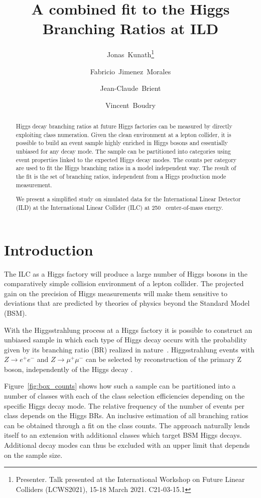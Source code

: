 \documentclass[11pt, hidelinks, a4paper]{scrartcl}
\title{\textbf{A combined fit to the Higgs Branching Ratios at ILD} }
\author{Jonas~Kunath\thanks{Presenter.
    Talk presented at the International Workshop on Future Linear Colliders (LCWS2021),
    15-18 March 2021. C21-03-15.1}
}
\author{Fabricio~Jimenez~Morales}
\author{Jean-Claude~Brient}
\author{Vincent~Boudry}
\affil{Laboratoire Leprince-Ringuet CNRS, \'Ecole Polytechnique,\hspace{2em} Institut Polytechnique de Paris, France}
\date{}
\newcommand{\eV}{\text{e\kern-0.15ex V}\xspace}
\newcommand{\GeV}{\text{G\eV}\xspace}
\begin{document}
\maketitle
\begin{abstract}
Higgs decay branching ratios at future Higgs factories
can be measured by directly exploiting class numeration.
Given the clean environment at a lepton collider,
it is possible to build an event sample highly enriched in Higgs bosons
and essentially unbiased for any decay mode.
The sample can be partitioned into categories using event properties
linked to the expected Higgs decay modes.
The counts per category are used to fit
the Higgs branching ratios in a model independent way.
The result of the fit is the set of branching ratios,
independent from a Higgs production mode measurement.

We present a simplified study on simulated data
for the International Linear Detector (ILD)
at the International Linear Collider (ILC) at 250~\GeV center-of-mass energy.
\end{abstract}

\section{Introduction}
The ILC as a Higgs factory will produce a large number of Higgs bosons
in the comparatively simple collision environment of a lepton collider.
The projected gain on the precision of Higgs measurements
will make them sensitive to deviations
that are predicted by theories of physics beyond the Standard Model (BSM).


With the Higgsstrahlung process at a Higgs factory
it is possible to construct an unbiased sample
in which each type of Higgs decay occurs with the probability given by
its branching ratio (BR) realized in nature~\cite{HiggsBR_LCWS2019}.
Higgsstrahlung events with $Z \to e^+ e^-$ and $Z \to \mu^+ \mu^-$
can be selected by reconstruction of the primary Z boson,
independently of the Higgs decay \cite{hRecoilIndependence}.

Figure~\ref{fig:box_counts} shows how such a sample can be partitioned
into a number of classes with each of the class selection efficiencies depending
on the specific Higgs decay mode.
The relative frequency of the number of events per class
depends on the Higgs BRs.
An inclusive estimation of all branching ratios can be obtained
through a fit on the class counts.
The approach naturally lends itself to an extension with additional classes
which target BSM Higgs decays.
Additional decay modes can thus be excluded
with an upper limit that depends on the sample size.
\end{document}
